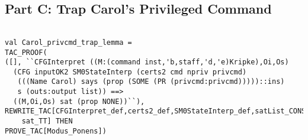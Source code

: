 \documentclass{article}
\begin{document}
\subsection{Part C: Trap Carol's Privileged Command}
\label{sec:part-c:-trap}


\HOLSMZeroSolutionsTheoremsCarolXXprivcmdXXtrapXXlemma
\HOLSMZeroSolutionsTheoremsCarolXXtrapXXprivcmdXXjustifiedXXthm
\HOLSMZeroSolutionsTheoremsCarolXXprivcmdXXtrappedXXthm
\HOLSMZeroSolutionsTheoremsCarolXXjustifiedXXprivcmdXXtrapXXthm


\begin{verbatim}

val Carol_privcmd_trap_lemma =
TAC_PROOF(
([], ``CFGInterpret ((M:(command inst,'b,staff,'d,'e)Kripke),Oi,Os)
  (CFG inputOK2 SM0StateInterp (certs2 cmd npriv privcmd)
   (((Name Carol) says (prop (SOME (PR (privcmd:privcmd)))))::ins)
   s (outs:output list)) ==>
  ((M,Oi,Os) sat (prop NONE))``),
REWRITE_TAC[CFGInterpret_def,certs2_def,SM0StateInterp_def,satList_CONS,satList_nil,
	sat_TT] THEN
PROVE_TAC[Modus_Ponens])



\end{verbatim}
\end{document}
